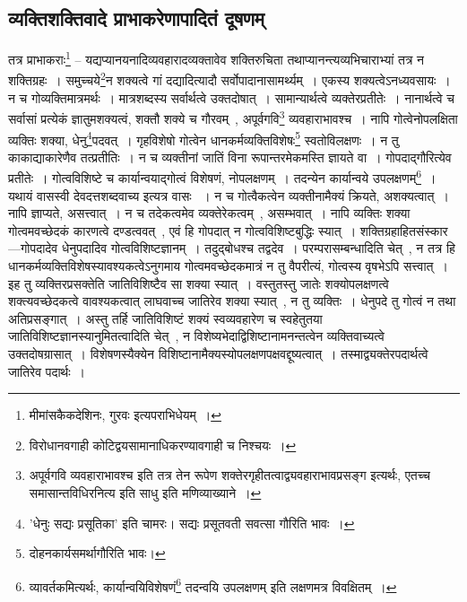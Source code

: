 		\subsection{व्यक्तिशक्तिवादे प्राभाकरेणापादितं दूषणम् }
			
			\begin{small}	

				तत्र प्राभाकराः\footnote{मीमांसकैकदेशिनः, गुरवः इत्यपराभिधेयम्~।} – यद्यप्यानयनादिव्यवहारादव्यक्तावेव शक्तिरुचिता तथाप्यानन्त्यव्यभिचाराभ्यां तत्र न शक्तिग्रहः~। समुच्चये\footnote{विरोधानवगाही कोटिद्वयसामानाधिकरण्यावगाही च निश्चयः~।}न शक्यत्वे गां दद्यादित्यादौ सर्वोपादानासामर्थ्यम्~। एकस्य शक्यत्वेऽनध्यवसायः~। न च गोव्यक्तिमात्रमर्थः~। मात्रशब्दस्य सर्वार्थत्वे उक्तदोषात्~। सामान्यार्थत्वे व्यक्तेरप्रतीतेः~। नानार्थत्वे च सर्वासां प्रत्येकं ज्ञातुमशक्यत्वं, शक्तौ शक्ये च गौरवम्~, अपूर्वगवि\footnote{अपूर्वगवि व्यवहाराभावश्च इति तत्र तेन रूपेण शक्तेरगृहीतत्वाद्व्यवहाराभावप्रसङ्ग इत्यर्थः, एतच्च समासान्तविधिरनित्य इति साधु इति मणिव्याख्याने~।} व्यवहाराभावश्च~। नापि गोत्वेनोपलक्षिता व्यक्तिः शक्या, धेनु\footnote{’धेनुः सद्यः प्रसूतिका’ इति चामरः। सद्यः प्रसूतवती सवत्सा गौरिति भावः~।}पदवत्~। गृहविशेषो गोत्वेन धानकर्मव्यक्तिविशेषः\footnote{दोहनकार्यसमर्थागौरिति भावः।} स्वतोविलक्षणः~। न तु काकाद्याकारेणैव तत्प्रतीतिः~। न च व्यक्तीनां जातिं विना रूपान्तरमेकमस्ति ज्ञायते वा~। गोपदाद्गौरित्येव प्रतीतेः~। गोत्वविशिष्टे च कार्यान्वयाद्गोत्वं विशेषणं, नोपलक्षणम्~। तदन्येन कार्यान्वये उपलक्षणम्\footnote{व्यावर्तकमित्यर्थः, कार्यान्वयिविशेषणं\footnote{विद्यमानं सत् व्यावर्तकम् , साक्षात्कार्यान्वयि इति यावत्~।} तदन्वयि उपलक्षणम् इति लक्षणमत्र विवक्षितम्~।}~। यथायं वासस्वी देवदत्तशब्दवाच्य इत्यत्र वासः ~। न च गोत्वैकत्वेन व्यक्तीनामैक्यं क्रियते, अशक्यत्वात्~। नापि ज्ञाप्यते, असत्त्वात्~। न च तदेकत्वमेव व्यक्तेरेकत्वम्~, असम्भवात्~। नापि व्यक्तिः शक्या गोत्वमवच्छेदकं कारणत्वे दण्डत्ववत्~, एवं हि गोपदात् न गोत्वविशिष्टबुद्धिः स्यात्~। शक्तिग्रहाहितसंस्कार---गोपदादेव धेनुपदादिव गोत्वविशिष्टज्ञानम्~। तदुद्बोधश्च तद्वदेव~। परम्परासम्बन्धादिति चेत्~, न तत्र हि धानकर्मव्यक्तिविशेषस्यावश्यकत्वेऽनुगमाय गोत्वमवच्छेदकमात्रं न तु वैपरीत्यं, गोत्वस्य वृषभेऽपि सत्त्वात्~। इह तु व्यक्तिरप्रसक्तेति जातिविशिष्टैव सा शक्या स्यात्~। वस्तुतस्तु जातेः शक्योपलक्षणत्वे शक्त्यवच्छेदकत्वे वावश्यकत्वात् लाघवाच्च जातिरेव शक्या स्यात्~, न तु व्यक्तिः~। धेनुपदे तु गोत्वं न तथा अतिप्रसङ्गात्~। अस्तु तर्हि जातिविशिष्टं शक्यं स्वव्यवहारेण च स्वहेतुतया जातिविशिष्टज्ञानस्यानुमितत्वादिति चेत्~, न विशेष्यभेदाद्विशिष्टानामनन्तत्वेन व्यक्तिवाच्यत्वे उक्तदोषग्रासात्~। विशेषणस्यैक्येन विशिष्टानामैक्यस्योपलक्षणपक्षवद्दूष्यत्वात्~। तस्माद्व्यक्तेरपदार्थत्वे जातिरेव पदार्थः~।


\end{small}
